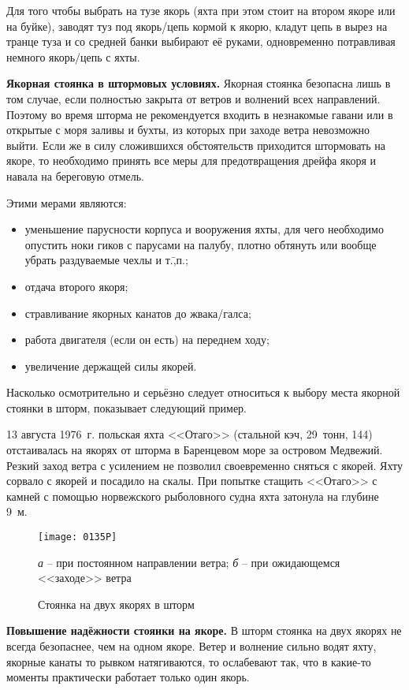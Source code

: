 Для того чтобы выбрать на тузе якорь (яхта при этом стоит на втором якоре или на буйке), заводят туз под якорь\-/цепь кормой к якорю, кладут цепь в вырез на транце туза и со средней банки выбирают её руками, одновременно потравливая немного якорь\-/цепь с яхты.

\textbf{Якорная стоянка в штормовых условиях.} Якорная стоянка безопасна лишь в том случае, если полностью закрыта от ветров и волнений всех направлений. Поэтому во время шторма не рекомендуется входить в незнакомые гавани или в открытые с моря заливы и бухты, из которых при заходе ветра невозможно выйти. Если же в силу сложившихся обстоятельств приходится штормовать на якоре, то необходимо принять все меры для предотвращения дрейфа якоря и навала на береговую отмель. 

Этими мерами являются: 
\begin{itemize}
\item уменьшение парусности корпуса и вооружения яхты, для чего необходимо опустить ноки гиков с парусами на палубу, плотно обтянуть или вообще убрать раздуваемые чехлы и т.\=,п.; 
\item отдача второго якоря; 
\item стравливание якорных канатов до жвака\-/галса; 
\item работа двигателя (если он есть) на переднем ходу; 
\item увеличение держащей силы якорей. 
\end{itemize}

Насколько осмотрительно и серьёзно следует относиться к выбору места якорной стоянки в шторм, показывает следующий пример.

{\small 13 августа 1976~г. польская яхта <<Отаго>> (стальной кэч, 29~тонн, 144\msq) отстаивалась на якорях от шторма в Баренцевом море за островом Медвежий. Резкий заход ветра с усилением не позволил своевременно сняться с якорей. Яхту сорвало с якорей и посадило на скалы. При попытке стащить <<Отаго>> с камней с помощью норвежского рыболовного судна яхта затонула на глубине 9~м.}

\begin{figure*}[htb]
  \centering{}
  \texttt{[image: 0135P]}
  \caption{Стоянка на двух якорях в шторм}
  \label{fig:135}
  \small
  \centering{}
  \textit{а} \--- при постоянном направлении ветра; \textit{б} \--- при ожидающемся <<заходе>> ветра
\end{figure*}

\textbf{Повышение надёжности стоянки на якоре.} В шторм стоянка на двух якорях не всегда безопаснее, чем на одном якоре. Ветер и волнение сильно водят яхту, якорные канаты то рывком натягиваются, то ослабевают так, что в какие-то моменты практически работает только один якорь.

